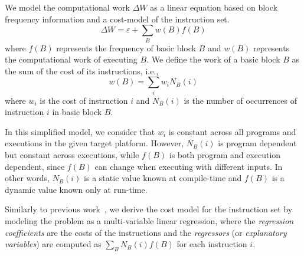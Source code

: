 \documentclass[sigplan,9pt]{acmart}
\newcommand{\itercomp}{{iterative compilation}}
\begin{document}


We model the computational work $\Delta W$ as a linear equation based on
block frequency information and a cost-model of the instruction set.
\[
\Delta W = \varepsilon + \sum_{B} w(B)f(B)
\]
where $f(B)$ represents the frequency of basic block $B$
and $w(B)$ represents the computational work of executing $B$.
We define the work of a basic block $B$ as the sum of the cost
of its instructions, i.e.,
\[
w(B) = \sum_{i} w_i N_B(i)
\]
where $w_i$ is the cost of instruction $i$ and $N_B(i)$ is the number of
occurrences of instruction $i$ in basic block $B$.

In this simplified model, we consider that $w_i$ is constant across all
programs and executions in the given target platform.
However, $N_B(i)$ is program dependent but constant across executions,
while $f(B)$ is both program and execution dependent, since $f(B)$ can
change when executing with different inputs.
In other words, $N_B(i)$ is a static value known at compile-time and 
$f(B)$ is a dynamic value known only at run-time.

%

Similarly to previous work~\cite{giusto01,powell09,brandolese11},
we derive the cost model for the instruction set by modeling the
problem as a multi-variable linear regression, where the
\textit{regression coefficients} are the costs of the instructions
and the \textit{regressors} (or \textit{explanatory variables})
are computed as $\sum_B N_B(i)f(B)$ for each instruction $i$.
\end{document}
